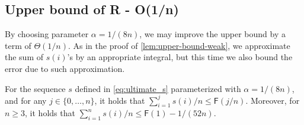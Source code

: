 \documentclass[a4paper,USenglish,cleveref]{lipics-v2019}
\newcommand{\fintegral}{\textsf{F}}
\begin{document}

\subsection{Upper bound of R - O(1/n)}

By choosing parameter $\alpha = 1/(8n)$, 
we may improve the upper bound by a term of $\Theta(1/n)$.
As in the proof of \cref{lem:upper-bound-weak}, 
we approximate the sum of $s(i)$'s by an appropriate integral, but 
this time we also bound the error due to such approximation.

\begin{lemma}
\label{lem:upper-bound-technical}
For the sequence $s$ defined in \eqref{eq:ultimate_s} parameterized
with $\alpha = 1/(8n)$, and for any $j \in \{0,\ldots,n\}$,
it holds that 
$\sum_{i=1}^j s(i)/n \leq \fintegral(j/n)$.
Moreover, for $n \geq 3$, it holds that 
$\sum_{i=1}^n s(i)/n \leq \fintegral(1) - 1/(52 n)$.
\end{lemma}
\end{document}
